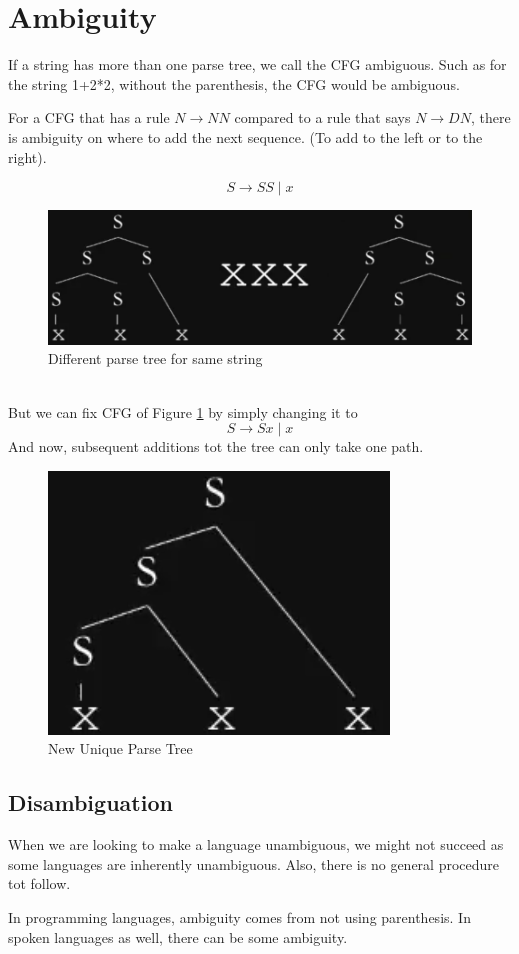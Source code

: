 \documentclass{article}
\begin{document}
    \section*{Ambiguity}
    If a string has more than one parse tree, we call the CFG ambiguous. Such as for the string 1+2*2, without the parenthesis, the CFG would be ambiguous.\par
    For a CFG that has a rule $N\to NN$  compared to a rule that says $N\to DN$, there is ambiguity on where to add the next sequence. (To add to the left or to the right).\par
    $$S\to SS\;|\;x$$
    \begin{figure}[h]
        \centerline{
            \includegraphics[scale=0.20]{Ambiguity.png}
        }\caption{Different parse tree for same string}
        \label{ambiguity}
    \end{figure}
    \\
    But we can fix CFG of Figure \ref{ambiguity} by simply changing it to
    $$S\to Sx\;|\;x$$
    And now, subsequent additions tot the tree  can only take one path.
    \begin{figure}[h]
        \centerline{
            \includegraphics[scale=0.25]{AmbiguityFix.png}
        }\label{ambiguityfix}
        \caption{New Unique Parse Tree}
    \end{figure}    
    \subsection*{Disambiguation}
    When we are looking to make a language unambiguous, we might not succeed as some languages are inherently unambiguous. Also, there is no general procedure tot follow.\par
    In programming languages, ambiguity comes from not using parenthesis. In spoken languages as well, there can be some ambiguity.
\end{document}
